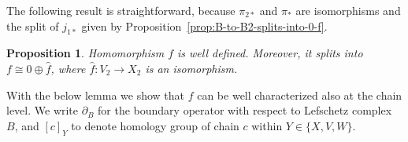 \documentclass[letterpaper,11pt]{article}
\theoremstyle{plain}
\newtheorem{proposition}[theorem]{Proposition}
\theoremstyle{definition}
\newcounter{li}
\newcommand{\Zgroup}{\mathsf{Z}}
\newcommand{\Cgroup}{\mathsf{C}}
\newcommand{\imap}[1]{j_{#1}}
\newcommand{\imapx}[1]{j_{#1\ast}}
\newcommand{\projmap}[1]{\pi_{#1}}
\newcommand{\projmapx}[1]{\pi_{#1\ast}}
\begin{document}
{The following result is straightforward, because $\projmapx{2}$ and $\projmapx{}$ are isomorphisms and the split of $\imapx{1}$ given by Proposition~\ref{prop:B-to-B2-splits-into-0-f}.

\begin{proposition}\label{prop:f-well-defined-apdx}
Homomorphism $f$ is well defined.
    Moreover, it splits into $f\cong 0\oplus \hat{f}$, where $\hat{f}:V_2\rightarrow X_2$ is an isomorphism.
\end{proposition}

    
    

With the below lemma we show that $f$ can be well characterized also at the chain level.
We write $\partial_B$ for the boundary operator with respect to Lefschetz complex $B$, 
    and $[c]_Y$ to denote homology group of chain $c$ within $Y\in\{X,V,W\}$.

}
\end{document}
